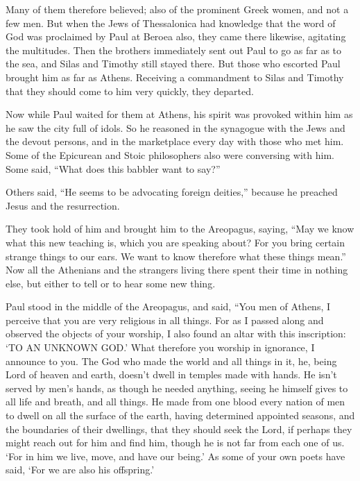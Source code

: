 {Many of them therefore believed; also of the prominent Greek women, and not a few men.
But when the Jews of Thessalonica had knowledge that the word of God was proclaimed by Paul at Beroea also, they came there likewise, agitating the multitudes.
Then the brothers immediately sent out Paul to go as far as to the sea, and Silas and Timothy still stayed there.
But those who escorted Paul brought him as far as Athens. Receiving a commandment to Silas and Timothy that they should come to him very quickly, they departed.
\par }{\PP {}Now while Paul waited for them at Athens, his spirit was provoked within him as he saw the city full of idols.
So he reasoned in the synagogue with the Jews and the devout persons, and in the marketplace every day with those who met him.
Some of the Epicurean and Stoic philosophers also were conversing with him. Some said, “What does this babbler want to say?”
\par }{\PP Others said, “He seems to be advocating foreign deities,” because he preached Jesus and the resurrection.
\par }{\PP {}They took hold of him and brought him to the Areopagus, saying, “May we know what this new teaching is, which you are speaking about?
For you bring certain strange things to our ears. We want to know therefore what these things mean.”
Now all the Athenians and the strangers living there spent their time in nothing else, but either to tell or to hear some new thing.
\par }{\PP {}Paul stood in the middle of the Areopagus, and said, “You men of Athens, I perceive that you are very religious in all things.
For as I passed along and observed the objects of your worship, I also found an altar with this inscription: ‘TO AN UNKNOWN GOD.’ What therefore you worship in ignorance, I announce to you.
The God who made the world and all things in it, he, being Lord of heaven and earth, doesn’t dwell in temples made with hands.
He isn’t served by men’s hands, as though he needed anything, seeing he himself gives to all life and breath, and all things.
He made from one blood every nation of men to dwell on all the surface of the earth, having determined appointed seasons, and the boundaries of their dwellings,
that they should seek the Lord, if perhaps they might reach out for him and find him, though he is not far from each one of us.
‘For in him we live, move, and have our being.’ As some of your own poets have said, ‘For we are also his offspring.’
}
